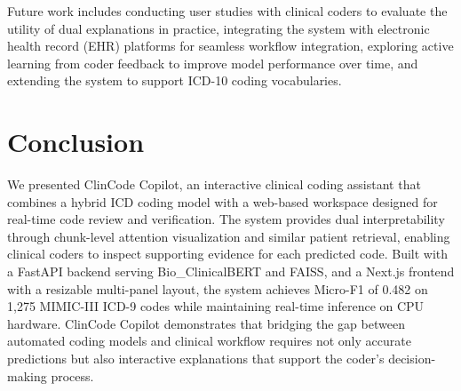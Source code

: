 \documentclass[conference]{IEEEtran}
\begin{document}
Future work includes conducting user studies with clinical coders to evaluate the utility of dual explanations in practice, integrating the system with electronic health record (EHR) platforms for seamless workflow integration, exploring active learning from coder feedback to improve model performance over time, and extending the system to support ICD-10 coding vocabularies.

\section{Conclusion}

We presented ClinCode Copilot, an interactive clinical coding assistant that combines a hybrid ICD coding model with a web-based workspace designed for real-time code review and verification. The system provides dual interpretability through chunk-level attention visualization and similar patient retrieval, enabling clinical coders to inspect supporting evidence for each predicted code. Built with a FastAPI backend serving Bio\_ClinicalBERT and FAISS, and a Next.js frontend with a resizable multi-panel layout, the system achieves Micro-F1 of 0.482 on 1,275 MIMIC-III ICD-9 codes while maintaining real-time inference on CPU hardware. ClinCode Copilot demonstrates that bridging the gap between automated coding models and clinical workflow requires not only accurate predictions but also interactive explanations that support the coder's decision-making process.

\FloatBarrier


\end{document}
